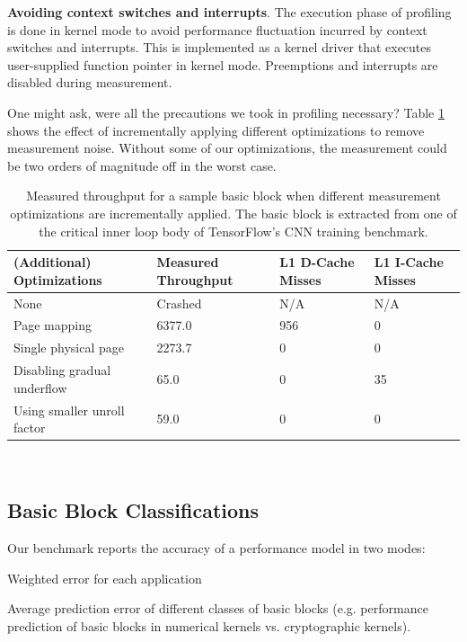 \textbf{Avoiding context switches and interrupts}.
The execution phase of profiling is done in kernel mode
to avoid performance fluctuation incurred by context switches
and interrupts.
This is implemented as a kernel driver that executes
user-supplied function pointer in kernel mode.
Preemptions and interrupts are disabled during measurement.

One might ask, were all the precautions we took in profiling necessary?
Table \ref{tab:ablation} shows the effect of incrementally applying
different optimizations to remove measurement noise.
Without some of our optimizations, the measurement could be 
two orders of magnitude off in the worst case.

\begin{table}
\begin{tabular}{
|p{}|p{}|p{}|p{}|}
\hline (Additional) Optimizations &
Measured Throughput &
L1 D-Cache Misses &
L1 I-Cache Misses \\

\hline
None & Crashed & N/A & N/A \\

\hline
Page mapping & 6377.0 & 956 & 0 \\

\hline
Single physical page & 2273.7 & 0 & 0 \\

\hline
Disabling gradual underflow & 65.0 & 0 & 35 \\

\hline
Using smaller unroll factor & 59.0 & 0 & 0\\

\hline
\end{tabular}
\\
\caption{Measured throughput for a sample basic block when
different measurement optimizations are incrementally applied.
The basic block is extracted from one of the critical 
inner loop body of TensorFlow\cite{tensorflow}'s CNN training benchmark.}
\label{tab:ablation}
\end{table}


\subsection{Basic Block Classifications}\label{classification}
Our benchmark reports the accuracy of a performance model in two modes:
\begin{enumerate*}
\item Weighted error for each application
\item Average prediction error of different classes of 
basic blocks (e.g. performance prediction
of basic blocks in numerical kernels vs.
cryptographic kernels).
\end{enumerate*}

